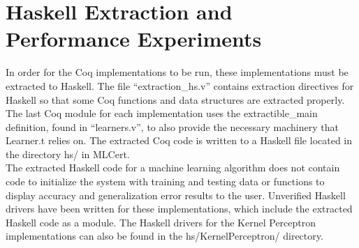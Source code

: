 \section{Haskell Extraction and Performance Experiments}\label{HaskellExtractionPerformance}
In order for the Coq implementations to be run, these implementations must be extracted to Haskell. The file ``extraction\_hs.v'' contains extraction directives for Haskell so that some Coq functions and data structures are extracted properly. The last Coq module for each implementation uses the extractible\_main definition, found in ``learners.v'', to also provide the necessary machinery that Learner.t relies on. The extracted Coq code is written to a Haskell file located in the directory hs/ in MLCert.
\\The extracted Haskell code for a machine learning algorithm does not contain code to initialize the system with training and testing data or functions to display accuracy and generalization error results to the user. Unverified Haskell drivers have been written for these implementations, which include the extracted Haskell code as a module. The Haskell drivers for the Kernel Perceptron implementations can also be found in the hs/KernelPerceptron/ directory.
